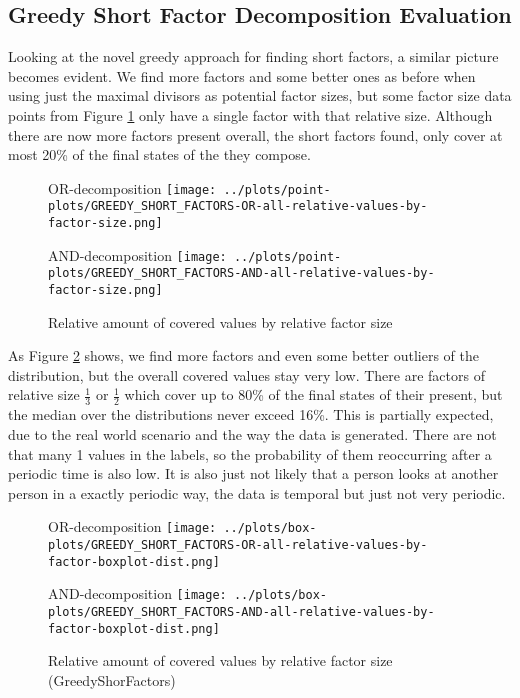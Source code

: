 \subsection{Greedy Short Factor Decomposition Evaluation}
\label{ch:Evaluation:decomposition-quality:greedy-short-factors}
Looking at the novel greedy approach for finding short factors, a similar picture becomes evident.
We find more factors and some better ones as before when using just the maximal divisors as potential factor sizes, but some factor size data points from Figure \ref{fig:eval:greedy-short-factors-all-factors} only have a single factor with that relative size.
Although there are now more factors present overall, the short factors found, only cover at most 20\% of the final states of the \DFA they compose.
\begin{figure}[h]
	\begin{minipage}[h]{0.49\linewidth}
		\centering
		OR-decomposition
		\texttt{[image: ../plots/point-plots/GREEDY\_SHORT\_FACTORS-OR-all-relative-values-by-factor-size.png]}
	\end{minipage}
	\begin{minipage}[h]{0.49\linewidth}
		\centering
		AND-decomposition
		\texttt{[image: ../plots/point-plots/GREEDY\_SHORT\_FACTORS-AND-all-relative-values-by-factor-size.png]}
	\end{minipage}
	\caption{Relative amount of covered values by relative factor size}
	\label{fig:eval:greedy-short-factors-all-factors}
\end{figure}
As Figure \ref{fig:eval:greedy-short-factors-all-factors-box-plot} shows, we find more factors and even some better outliers of the distribution, but the overall covered values stay very low.
There are factors of relative size $\frac{1}{3}$ or $\frac{1}{2}$ which cover up to 80\% of the final states of their \DFA present, but the median over the distributions never exceed 16\%.
This is partially expected, due to the real world scenario and the way the data is generated.
There are not that many 1 values in the labels, so the probability of them reoccurring after a periodic time is also low.
It is also just not likely that a person looks at another person in a exactly periodic way, the data is temporal but just not very periodic.
\begin{figure}[t]
	\begin{minipage}[h]{0.49\linewidth}
		\centering
		OR-decomposition
		\texttt{[image: ../plots/box-plots/GREEDY\_SHORT\_FACTORS-OR-all-relative-values-by-factor-boxplot-dist.png]}
	\end{minipage}
	\begin{minipage}[h]{0.49\linewidth}
		\centering
		AND-decomposition
		\texttt{[image: ../plots/box-plots/GREEDY\_SHORT\_FACTORS-AND-all-relative-values-by-factor-boxplot-dist.png]}
	\end{minipage}
	\caption{Relative amount of covered values by relative factor size (GreedyShorFactors)}
	\label{fig:eval:greedy-short-factors-all-factors-box-plot}
\end{figure}



